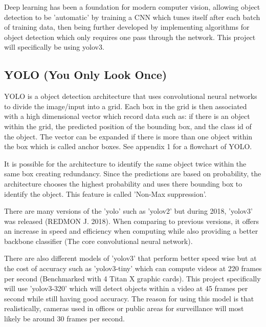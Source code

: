 \documentclass[12pt]{report}
\begin{document}
Deep learning has been a foundation for modern computer vision, allowing object detection to be 'automatic' by training a CNN which tunes itself after each batch of training data, then being further developed by implementing algorithms for object detection which only requires one pass through the network. This project will specifically be using yolov3.

\subsection{YOLO (You Only Look Once)}

YOLO is a object detection architecture that uses convolutional neural networks to divide the image/input into a grid. Each box in the grid is then associated with a high dimensional vector which record data such as: if there is an object within the grid, the predicted position of the bounding box, and the class id of the object. The vector can be expanded if there is more than one object within the box which is called anchor boxes. See appendix 1 for a flowchart of YOLO.

\vspace{2mm}

It is possible for the architecture to identify the same object twice within the same box creating redundancy. Since the predictions are based on probability, the architecture chooses the highest probability and uses there bounding box to identify the object. This feature is called 'Non-Max suppression'.

\vspace{2mm}

There are many versions of the 'yolo' such as 'yolov2' but during 2018, 'yolov3' was released (REDMON J. 2018). When comparing to previous versions, it offers an increase in speed and efficiency when computing while also providing a better backbone classifier (The core convolutional neural network). 

\vspace{2mm}
There are also different models of 'yolov3' that perform better speed wise but at the cost of accuracy such as 'yolov3-tiny' which can compute videos at 220 frames per second (Benchmarked with 4 Titan X graphic cards). This project specifically will use 'yolov3-320' which will detect objects within a video at 45 frames per second while still having good accuracy. The reason for using this model is that realistically, cameras used in offices or public areas for surveillance will most likely be around 30 frames per second.
\end{document}
